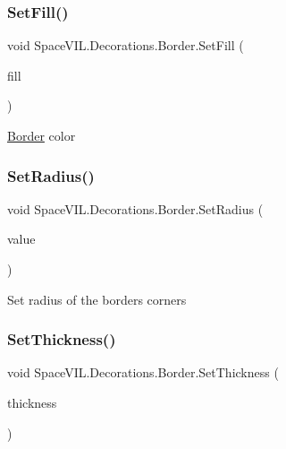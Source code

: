 \subsubsection{\texorpdfstring{Set\+Fill()}{SetFill()}}
{\footnotesize\ttfamily void Space\+V\+I\+L.\+Decorations.\+Border.\+Set\+Fill (\begin{DoxyParamCaption}\item[{Color}]{fill }\end{DoxyParamCaption})}



\mbox{\hyperlink{class_space_v_i_l_1_1_decorations_1_1_border}{Border}} color 

\mbox{\label{class_space_v_i_l_1_1_decorations_1_1_border_a800519d1eb6417875e3002c5c8cb67de}} 
\subsubsection{\texorpdfstring{Set\+Radius()}{SetRadius()}}
{\footnotesize\ttfamily void Space\+V\+I\+L.\+Decorations.\+Border.\+Set\+Radius (\begin{DoxyParamCaption}\item[{\mbox{\hyperlink{class_space_v_i_l_1_1_decorations_1_1_corner_radius}{Corner\+Radius}}}]{value }\end{DoxyParamCaption})}



Set radius of the border\textquotesingle{}s corners 

\mbox{\label{class_space_v_i_l_1_1_decorations_1_1_border_aa6c20c4eafe53ebeac542ec35cc2239c}} 
\subsubsection{\texorpdfstring{Set\+Thickness()}{SetThickness()}}
{\footnotesize\ttfamily void Space\+V\+I\+L.\+Decorations.\+Border.\+Set\+Thickness (\begin{DoxyParamCaption}\item[{int}]{thickness }\end{DoxyParamCaption})}



